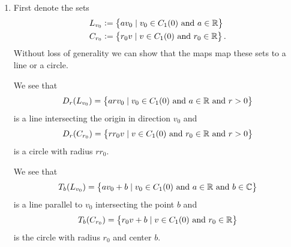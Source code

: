 \documentclass[11pt,a4paper]{article}
\begin{document}
\begin{solution} \phantom{}
\begin{enumerate}
  \item[(1)] 
    First denote the sets
    \begin{align*}
      &L_{v_0} := \left\{a v_0 \mid v_0 \in C_1(0) \text{ and } a \in \mathbb{R}\right\} \\
      &C_{r_0} := \left\{r_0 v \mid v \in C_1(0) \text{ and } r_0 \in \mathbb{R}\right\}.
    \end{align*}
    Without loss of generality we can show that the maps map these sets
    to a line or a circle.

    We see that
    \[
      D_r(L_{v_0}) = \left\{a r v_0 \mid v_0 \in C_1(0) \text{ and } a \in \mathbb{R} \text{ and } r > 0\right\}
    \]
    is a line intersecting the origin in direction $v_0$ and
    \[
      D_r(C_{r_0}) = \left\{r r_0 v \mid v \in C_1(0) \text{ and } r_0 \in \mathbb{R} \text{ and } r > 0\right\}
    \]
    is a circle with radius $r r_0$.

    We see that
    \[
      T_b(L_{v_0}) =
      \left\{a v_0 + b \mid v_0 \in C_1(0) \text{ and } a \in \mathbb{R} \text{ and } b \in \mathbb{C}\right\}
    \]
    is a line parallel to $v_0$ intersecting the point $b$ and
    \[
      T_b(C_{r_0}) = \left\{r_0 v + b \mid v \in C_1(0) \text{ and } r_0 \in \mathbb{R}\right\}
    \]
    is the circle with radius $r_0$ and center $b$.


\end{enumerate}
\end{solution}
\end{document}
